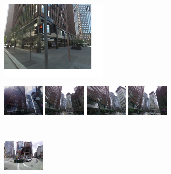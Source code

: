 \documentclass[table]{article} %
\begin{document}
    \begin{figure}
        \begin{minipage}{0.34\linewidth}
            \centering
            \vspace{5mm}
            \includegraphics[height=40mm]{imgs/ex1/query}
        \end{minipage}
        \begin{minipage}{0.75\linewidth}
            \begin{minipage}{\linewidth} 
                \colorbox{myGreen}{\includegraphics[height=16mm]{imgs/ex1/FVsvm1}}
                \colorbox{myGreen}{\includegraphics[height=16mm]{imgs/ex1/FVsvm2}}
                \colorbox{myGreen}{\includegraphics[height=16mm]{imgs/ex1/FVsvm3}}
                \colorbox{myGreen}{\includegraphics[height=16mm]{imgs/ex1/FVsvm4}}
            \end{minipage}
            \\
            \begin{minipage}{\linewidth}
                \colorbox{myRed}{\includegraphics[height=16mm]{imgs/ex1/FV1}}

\end{minipage}
\end{minipage}
\end{figure}
\end{document}
